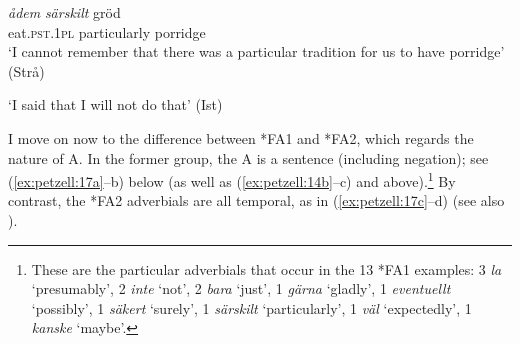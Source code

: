 \documentclass[output=paper,colorlinks,citecolor=brown,draft,draftmode]{langscibook}
\begin{document}
\ea\label{ex:petzell:15}

\gll \textit{ådem} \textit{särskilt}      gröd   \\
     eat.\textsc{pst}.1\textsc{pl}    particularly    porridge\\
\glt `I cannot remember that there was a particular tradition for us to have porridge’ (Strå)  \\


\glt `I said that I will not do that’ (Ist)
\z
\z

\ea\label{ex:petzell:16}
    

\z
\z


I move on now to the difference between *FA1 and *FA2, which regards the nature of A. In the former group, the A is a sentence  (including negation); see (\ref{ex:petzell:17a}–b) below (as well as (\ref{ex:petzell:14b}–c) and  above).\footnote{These are the particular adverbials that occur in the 13 *FA1 examples: 3 \textit{la} `presumably’, 2 \textit{inte} ‘not’, 2 \textit{bara} ‘just’, 1 \textit{gärna} ‘gladly’, 1 \textit{eventuellt} ‘possibly’, 1 \textit{säkert} ‘surely’, 1 \textit{särskilt} ‘particularly’, 1 \textit{väl} ‘expectedly’, 1 \textit{kanske} ‘maybe’.} By contrast, the *FA2 adverbials are all temporal, as in (\ref{ex:petzell:17c}–d) (see also ).{}
\end{document}
